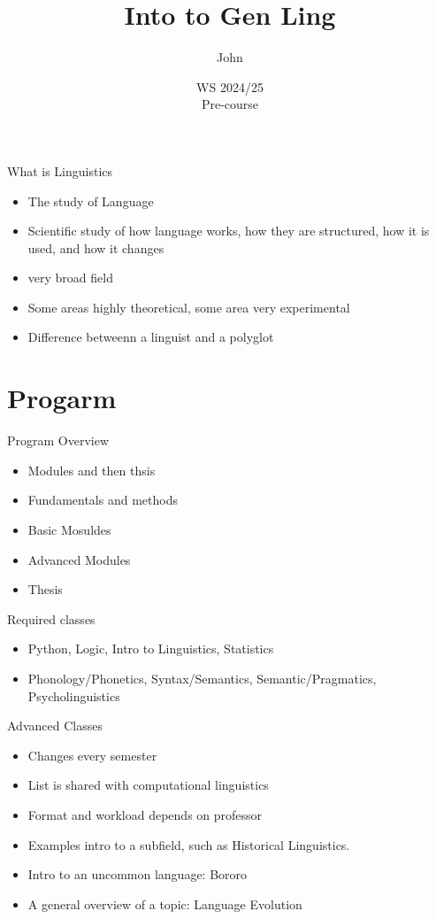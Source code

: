 \documentclass[aspectratio=169,hyperref={unicode}]{beamer}
\title{Into to Gen Ling}
\author{John}
\institute{Fachschaft General \& Computational Linguistics\\ \textbf{University of Tübingen}}
\date{WS 2024/25 \\ Pre-course}
\begin{document}
\frame{\titlepage}


\begin{frame}{What is Linguistics}
  \begin{itemize}
\item The study of Language
          \item Scientific study of how language works, how they are structured, how it is used, and how it changes
    \item very broad field
          \item Some areas highly theoretical, some area very experimental
          \item Difference betweenn a linguist and a polyglot
  \end{itemize}
\end{frame}

\section{Progarm}

\begin{frame}{Program Overview}
  \begin{itemize}
    \item Modules and then thsis
    \item Fundamentals and methods
    \item Basic Mosuldes
    \item Advanced Modules
          \item Thesis
  \end{itemize}

\end{frame}

\begin{frame}{Required classes}
\begin{itemize}
  \item Python, Logic, Intro to Linguistics, Statistics
        \item Phonology/Phonetics, Syntax/Semantics, Semantic/Pragmatics, Psycholinguistics
\end{itemize}

\end{frame}
\begin{frame}{Advanced Classes}
  \begin{itemize}
  \item Changes every semester
  \item List is shared with computational linguistics
  \item Format and workload depends on professor
  \item Examples intro to a subfield, such as Historical Linguistics.
  \item Intro to an uncommon language: Bororo
  \item A general overview of a topic: Language Evolution
  \end{itemize}
\end{frame}
\end{document}
